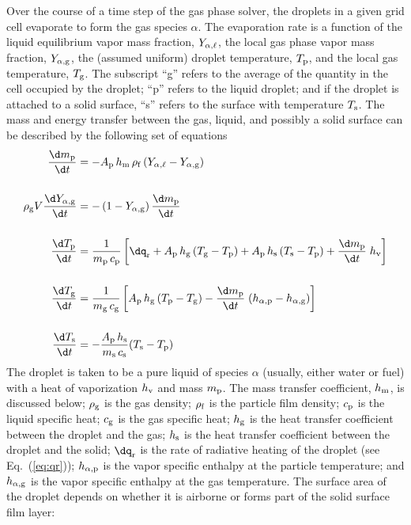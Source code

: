 Over the course of a time step of the gas phase solver, the droplets in a given grid cell evaporate to form the gas species $\alpha$. The evaporation rate is a function of the liquid equilibrium vapor mass fraction, $Y_{\rm \alpha,\ell}$, the local gas phase vapor mass fraction, $Y_{\rm \alpha,g}$, the (assumed uniform) droplet temperature, $T_{\rm p}$, and the local gas temperature, $T_{\rm g}$. The subscript ``g'' refers to the average of the quantity in the cell occupied by the droplet; ``p'' refers to the liquid droplet; and if the droplet is attached to a solid surface, ``s'' refers to the surface with temperature $T_{\rm s}$. The mass and energy transfer between the gas, liquid, and possibly a solid surface can be described by the following set of equations~\cite{Cheremisinoff:1}
\begin{align}
\frac{\d m_{\rm p}}{\d t} & = - A_{\rm p} \, h_{\rm m} \, \rho_{\rm f} \, (Y_{\alpha,\ell} - Y_{\rm \alpha, g}) \label{droplet_mass} \\[0.2in]
\rho_{\rm g} V \frac{\d Y_{\rm \alpha, g}}{\d t} & = -\left(1-Y_{\rm \alpha, g}\right)\frac{\d m_{\rm p}}{\d t}  \label{droplet_gas_fraction} \\[0.2in]
\frac{\d T_{\rm p}}{\d t} & = \frac{1}{m_{\rm p} \, c_{\rm p}}  \left[ \dq_{\rm r} + A_{\rm p} \, h_{\rm g}  \, (T_{\rm g}-T_{\rm p}) + A_{\rm p} \, h_{\rm s}  \, (T_{\rm s}-T_{\rm p}) + \frac{\d m_{\rm p}}{\d t} \; h_{\rm v} \right]  \label{droplet_temp}  \\[0.2in]
\frac{\d T_{\rm g}}{\d t} & = \frac{1}{m_{\rm g} \, c_{\rm g}}  \left[A_{\rm p} \, h_{\rm g}  \, (T_{\rm p}-T_{\rm g}) - \frac{\d m_{\rm p}}{\d t} \; (h_{\rm \alpha,p}-h_{\rm \alpha,g}) \right]  \label{droplet_gas_temp}   \\[0.2in]
\frac{\d T_{\rm s}}{\d t} & = -\frac{A_{\rm p} \, h_{\rm s}}{m_{\rm s} \, c_{\rm s}} (T_{\rm s}-T_{\rm p})  \label{droplet_solid_temp}
\end{align}
The droplet is taken to be a pure liquid of species $\alpha$ (usually, either water or fuel) with a heat of vaporization $h_{\rm v}$ and mass $m_{\rm p}$. The mass transfer coefficient, $h_{\rm m}$, is discussed below; $\rho_{\rm g}$ is the gas density; $\rho_{\rm f}$ is the particle film density; $c_{\rm p}$ is the liquid specific heat; $c_{\rm g}$ is the gas specific heat; $h_{\rm g}$ is the heat transfer coefficient between the droplet and the gas; $h_{\rm s}$ is the heat transfer coefficient between the droplet and the solid; $\dq_{\rm r}$ is the rate of radiative heating of the droplet (see Eq.~(\ref{eq:qr})); $h_{\rm \alpha,p}$ is the vapor specific enthalpy at the particle temperature; and $h_{\rm \alpha,g}$ is the vapor specific enthalpy at the gas temperature. The surface area of the droplet depends on whether it is airborne or forms part of the solid surface film layer:
